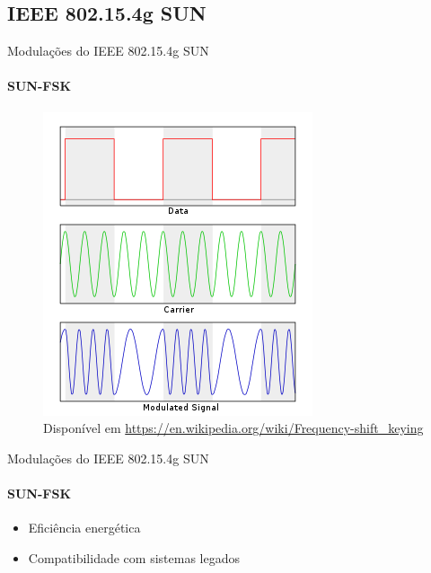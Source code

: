 \documentclass[c]{beamer}
\begin{document}
\begin{darkframes}

  \section{IEEE 802.15.4g SUN}
  \begin{frame}{Modulações do IEEE 802.15.4g SUN}
    \framesubtitle{SUN-FSK}
    \begin{figure}
      \centering
      \includegraphics[width=.5\textwidth]{resources/Fsk.png}\\
      \footnotesize{Disponível em \url{https://en.wikipedia.org/wiki/Frequency-shift_keying}}
    \end{figure}
  \end{frame}

  \begin{frame}{Modulações do IEEE 802.15.4g SUN}
    \framesubtitle{SUN-FSK}
    \begin{exampleblock}{\begin{itemize}
          \item Eficiência energética
          \item Compatibilidade com sistemas legados
        \end{itemize}}
    \end{exampleblock}


\end{frame}
\end{darkframes}
\end{document}
